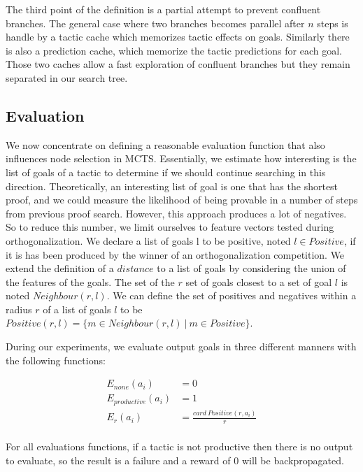 \documentclass[runningheads,a4paper,draft]{svjour3}
\begin{document}
The third point of the definition is a partial attempt to prevent confluent 
branches. The general 
case where two branches becomes parallel after $n$ steps is handle by a
tactic cache which memorizes tactic effects on goals. Similarly there is also a 
prediction cache, which memorize the tactic predictions for each goal. Those 
two caches allow a fast exploration of confluent branches but they remain 
separated in our search tree.


\subsection{Evaluation} 

We now concentrate on defining a reasonable evaluation function that also 
influences node selection in MCTS. Essentially, we estimate how 
interesting is the list of goals of a tactic to determine if we should continue 
searching in this direction. Theoretically, an interesting list of goal is one 
that has the shortest proof, and we could measure the likelihood of being 
provable in a number of steps from previous proof search. However, this 
approach produces a lot of negatives. So to reduce this number, we limit 
ourselves to feature vectors tested during orthogonalization. We declare a list 
of goals l to be positive, noted $l \in Positive$, if it is has been 
produced by the winner of an orthogonalization competition. We extend the 
definition of a $distance$ to a list of goals by considering the union of the 
features of the goals. The set of the $r$ set of goals closest to a set of 
goal $l$ is noted $Neighbour(r,l)$. We can define the set of positives and 
negatives within a radius $r$ of a 
list of goals $l$ to be $Positive(r,l) = \lbrace m \in Neighbour(r,l)\ |\ m \in 
Positive \rbrace$.

During our experiments, we evaluate output goals in three different manners 
with the following functions:

\begin{align*}
E_{none} (a_i) &= 0 \\
E_{productive} (a_i) &= 1\\
E_r (a_i) &= \frac{card\ Positive(r,a_i)}{r}\\
\end{align*}


For all evaluations functions, if a tactic is not productive then there is no 
output to evaluate, so the result is a failure and a reward of $0$ will be 
backpropagated.
\end{document}
